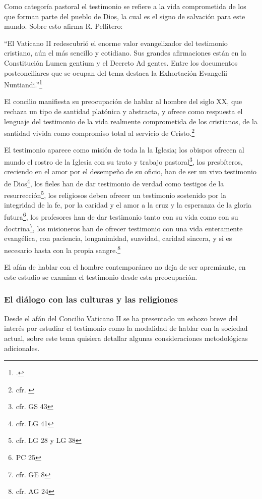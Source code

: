 \documentclass[12pt]{article}
\begin{document}
{Como categoría pastoral el testimonio se refiere a la vida comprometida de los que forman parte del pueblo de Dios, la cual es el signo de salvación para este mundo. Sobre esto afirma R. Pellitero:

``El Vaticano II redescubrió el enorme valor evangelizador del testimonio cristiano, aún el más sencillo y cotidiano. Sus grandes afirmaciones están en la Constitución Lumen gentium y el Decreto Ad gentes. Entre los documentos postconciliares que se ocupan del tema destaca la Exhortación Evangelii Nuntiandi.''\footcite[378--379]{ftcpellitero}

El concilio manifiesta su preocupación de hablar al hombre del siglo XX, que rechaza un tipo de santidad platónica y abstracta, y ofrece como respuesta el lenguaje del testimonio de la vida realmente comprometida de los cristianos, de la santidad vivida como compromiso total al servicio de Cristo.\footnote{cfr. \cite[1532 y 1533]{dicctf}} 

El testimonio aparece como misión de toda la la Iglesia; los obispos ofrecen al mundo el rostro de la Iglesia con su trato y trabajo pastoral\footnote{cfr. GS 43}, los presbíteros, creciendo en el amor por el desempeño de su oficio, han de ser un vivo testimonio de Dios\footnote{cfr. LG 41}, los fieles han de dar testimonio de verdad como testigos de la resurrección\footnote{cfr. LG 28 y LG 38}, los religiosos deben ofrecer un testimonio sostenido por la integridad de la fe, por la caridad y el amor a la cruz y la esperanza de la gloria futura\footnote{PC 25}, los profesores han de dar testimonio tanto con su vida como con su doctrina\footnote{cfr. GE 8}, los misioneros han de ofrecer testimonio con una vida enteramente evangélica, con paciencia, longanimidad, suavidad, caridad sincera, y si es necesario hasta con la propia sangre.\footnote{cfr. AG 24}

El afán de hablar con el hombre contemporáneo no deja de ser apremiante, en este estudio se examina el testimonio desde esta preocupación. 

\subsubsection{El diálogo con las culturas y las religiones}
Desde el afán del Concilio Vaticano II se ha presentado un esbozo breve del interés por estudiar el testimonio como la modalidad de hablar con la sociedad actual, sobre este tema quisiera detallar algunas consideraciones metodológicas adicionales.

}
\end{document}
